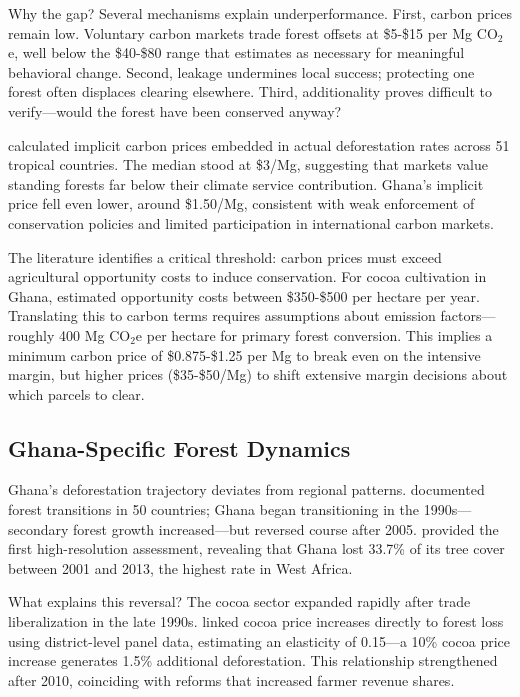 Why the gap? Several mechanisms explain underperformance. First, carbon prices remain low. Voluntary carbon markets trade forest offsets at \$5-\$15 per Mg CO$_2$e, well below the \$40-\$80 range that \citet{stern2007economics} estimates as necessary for meaningful behavioral change. Second, leakage undermines local success; protecting one forest often displaces clearing elsewhere. Third, additionality proves difficult to verify—would the forest have been conserved anyway?

\citet{busch2019forest} calculated implicit carbon prices embedded in actual deforestation rates across 51 tropical countries. The median stood at \$3/Mg, suggesting that markets value standing forests far below their climate service contribution. Ghana's implicit price fell even lower, around \$1.50/Mg, consistent with weak enforcement of conservation policies and limited participation in international carbon markets.

The literature identifies a critical threshold: carbon prices must exceed agricultural opportunity costs to induce conservation. For cocoa cultivation in Ghana, \citet{kroeger2017forest} estimated opportunity costs between \$350-\$500 per hectare per year. Translating this to carbon terms requires assumptions about emission factors—roughly 400 Mg CO$_2$e per hectare for primary forest conversion. This implies a minimum carbon price of \$0.875-\$1.25 per Mg to break even on the intensive margin, but higher prices (\$35-\$50/Mg) to shift extensive margin decisions about which parcels to clear.

\subsection{Ghana-Specific Forest Dynamics}

Ghana's deforestation trajectory deviates from regional patterns. \citet{keenan2015dynamics} documented forest transitions in 50 countries; Ghana began transitioning in the 1990s—secondary forest growth increased—but reversed course after 2005. \citet{hansen2013high} provided the first high-resolution assessment, revealing that Ghana lost 33.7\% of its tree cover between 2001 and 2013, the highest rate in West Africa.

What explains this reversal? The cocoa sector expanded rapidly after trade liberalization in the late 1990s. \citet{kroeger2017forest} linked cocoa price increases directly to forest loss using district-level panel data, estimating an elasticity of 0.15—a 10\% cocoa price increase generates 1.5\% additional deforestation. This relationship strengthened after 2010, coinciding with reforms that increased farmer revenue shares.

